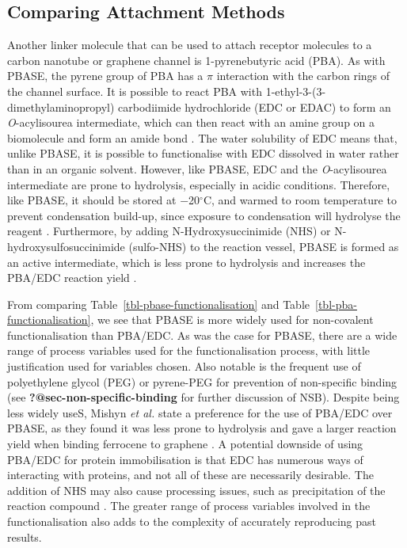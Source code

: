 \documentclass[
  a4paper,
]{scrbook}
\begin{document}
\hypertarget{comparing-attachment-methods-1}{%
\subsection{Comparing Attachment
Methods}\label{comparing-attachment-methods-1}}

Another linker molecule that can be used to attach receptor molecules to
a carbon nanotube or graphene channel is 1-pyrenebutyric acid (PBA). As
with PBASE, the pyrene group of PBA has a \(\pi\) interaction with the
carbon rings of the channel surface. It is possible to react PBA with
1-ethyl-3-(3-dimethylaminopropyl) carbodiimide hydrochloride (EDC or
EDAC) to form an \emph{O}-acylisourea intermediate, which can then react
with an amine group on a biomolecule and form an amide bond
\autocite{Sehgal1994,Hermanson2013-4}. The water solubility of EDC means
that, unlike PBASE, it is possible to functionalise with EDC dissolved
in water rather than in an organic solvent. However, like PBASE, EDC and
the \emph{O}-acylisourea intermediate are prone to hydrolysis,
especially in acidic conditions. Therefore, like PBASE, it should be
stored at −20\(^\circ\)C, and warmed to room temperature to prevent
condensation build-up, since exposure to condensation will hydrolyse the
reagent \autocite{Hermanson2013-4}. Furthermore, by adding
N-Hydroxysuccinimide (NHS) or N-hydroxysulfosuccinimide (sulfo-NHS) to
the reaction vessel, PBASE is formed as an active intermediate, which is
less prone to hydrolysis and increases the PBA/EDC reaction yield
\autocite{Sehgal1994,Hermanson2013-4,Hermanson2013-14}.

From comparing Table~\ref{tbl-pbase-functionalisation} and
Table~\ref{tbl-pba-functionalisation}, we see that PBASE is more widely
used for non-covalent functionalisation than PBA/EDC. As was the case
for PBASE, there are a wide range of process variables used for the
functionalisation process, with little justification used for variables
chosen. Also notable is the frequent use of polyethylene glycol (PEG) or
pyrene-PEG for prevention of non-specific binding (see
\textbf{?@sec-non-specific-binding} for further discussion of NSB).
Despite being less widely useS, Mishyn \emph{et al.} state a preference
for the use of PBA/EDC over PBASE, as they found it was less prone to
hydrolysis and gave a larger reaction yield when binding ferrocene to
graphene \autocite{Mishyn2022}. A potential downside of using PBA/EDC
for protein immobilisation is that EDC has numerous ways of interacting
with proteins, and not all of these are necessarily desirable. The
addition of NHS may also cause processing issues, such as precipitation
of the reaction compound \autocite{Hermanson2013-4}. The greater range
of process variables involved in the functionalisation also adds to the
complexity of accurately reproducing past results.
\end{document}
